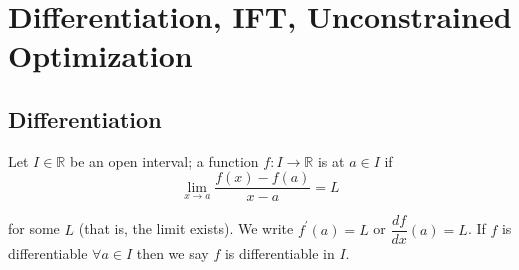 \documentclass{article}
\begin{document}
\displayoptions

\section{Differentiation, IFT, Unconstrained Optimization}
\label{sec:differentiation_ift_unconstrained_optimization}

\localtableofcontents

\subsection{Differentiation}
\label{sub:differentiation}

\begin{definition}
  Let $I \in \mathbb{R}$ be an open interval; a function $f: I \to \mathbb{R}$ is  at $a \in I$ if
  \[
    \lim_{x \to a} \dfrac{f(x) - f(a)}{x - a} = L
  \]

  for some $L$ (that is, the limit exists). We write $f^\prime(a) = L$ or $\dfrac{df}{dx}(a) = L$. If $f$ is  differentiable $\forall a \in I$ then we say $f$ is differentiable in $I$.
\end{definition}
\end{document}
